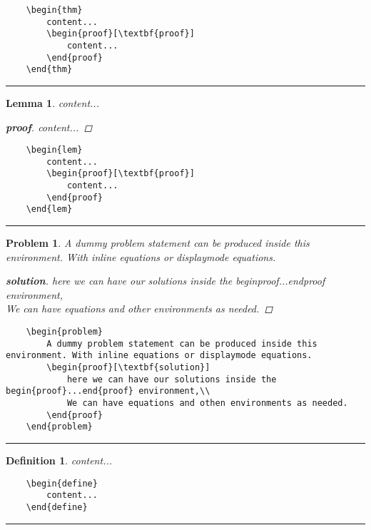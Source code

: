 \documentclass{article}
\newtheorem{problem}{Problem}[section]
\newtheorem{lem}{Lemma}[section]
\newtheorem{thm}{Theorem}[section]
\newtheorem{define}{Definition}[section]
\begin{document}
\begin{verbatim}
	\begin{thm} 
		content...
		\begin{proof}[\textbf{proof}]
			content...
		\end{proof}
	\end{thm}
\end{verbatim}

\rule{\textheight}{0.4pt}

\pagebreak
\begin{lem}
	content...
	\begin{proof}[\textbf{proof}]
		content...
	\end{proof}
\end{lem}

\begin{verbatim}
	\begin{lem}
		content...
		\begin{proof}[\textbf{proof}]
			content...
		\end{proof}
	\end{lem}
\end{verbatim}
\rule{\textheight}{0.4pt}


\begin{problem}
	A dummy problem statement can be produced inside this environment. With inline equations or displaymode equations.
	\begin{proof}[\textbf{solution}]%
		here we can have our solutions inside the begin{proof}...end{proof} environment,\\
		We can have equations and other environments as needed.
	\end{proof}
\end{problem}

\begin{verbatim}
	\begin{problem}
		A dummy problem statement can be produced inside this environment. With inline equations or displaymode equations.
		\begin{proof}[\textbf{solution}]
			here we can have our solutions inside the begin{proof}...end{proof} environment,\\
			We can have equations and othen environments as needed.
		\end{proof}
	\end{problem}
\end{verbatim}

\rule{\textheight}{0.4pt}



\begin{define}
	content...
\end{define}

\begin{verbatim}
	\begin{define}
		content...
	\end{define}
\end{verbatim}

\rule{\textheight}{0.4pt}
\end{document}
